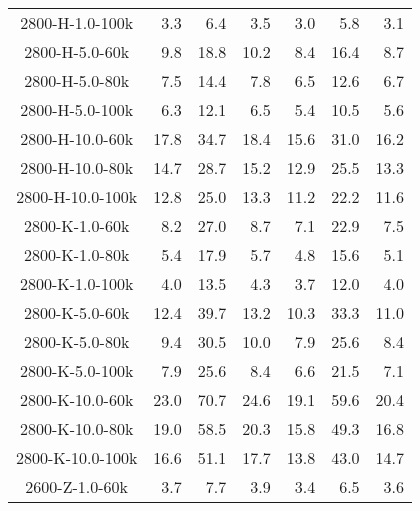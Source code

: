 \begin{longtable}{crrrrrr}
      2800-H-1.0-100k &         3.3 &         6.4 &         3.5 &            3.0 &            5.8 &            3.1 \\
      2800-H-5.0-60k &         9.8 &        18.8 &        10.2 &            8.4 &           16.4 &            8.7 \\
      2800-H-5.0-80k &         7.5 &        14.4 &         7.8 &            6.5 &           12.6 &            6.7 \\
      2800-H-5.0-100k &         6.3 &        12.1 &         6.5 &            5.4 &           10.5 &            5.6 \\
      2800-H-10.0-60k &        17.8 &        34.7 &        18.4 &           15.6 &           31.0 &           16.2 \\
      2800-H-10.0-80k &        14.7 &        28.7 &        15.2 &           12.9 &           25.5 &           13.3 \\
      2800-H-10.0-100k &        12.8 &        25.0 &        13.3 &           11.2 &           22.2 &           11.6 \\
      2800-K-1.0-60k &         8.2 &        27.0 &         8.7 &            7.1 &           22.9 &            7.5 \\
      2800-K-1.0-80k &         5.4 &        17.9 &         5.7 &            4.8 &           15.6 &            5.1 \\
      2800-K-1.0-100k &         4.0 &        13.5 &         4.3 &            3.7 &           12.0 &            4.0 \\
      2800-K-5.0-60k &        12.4 &        39.7 &        13.2 &           10.3 &           33.3 &           11.0 \\
      2800-K-5.0-80k &         9.4 &        30.5 &        10.0 &            7.9 &           25.6 &            8.4 \\
      2800-K-5.0-100k &         7.9 &        25.6 &         8.4 &            6.6 &           21.5 &            7.1 \\
      2800-K-10.0-60k &        23.0 &        70.7 &        24.6 &           19.1 &           59.6 &           20.4 \\
      2800-K-10.0-80k &        19.0 &        58.5 &        20.3 &           15.8 &           49.3 &           16.8 \\
      2800-K-10.0-100k &        16.6 &        51.1 &        17.7 &           13.8 &           43.0 &           14.7 \\
      2600-Z-1.0-60k &         3.7 &         7.7 &         3.9 &            3.4 &            6.5 &            3.6 \\

\end{longtable}

